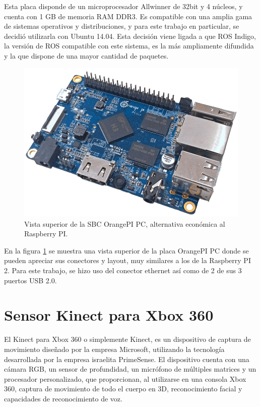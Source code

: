 Esta placa disponde de un microprocesador Allwinner de 32bit y 4 núcleos, y cuenta con 1 GB de memoria RAM DDR3. Es compatible con una amplia gama de sistemas operativos y distribuciones, y para este trabajo en particular, se decidió utilizarla con Ubuntu 14.04. Esta decisión viene ligada a que ROS Indigo, la versión de ROS compatible con este sistema, es la más ampliamente difundida y la que dispone de una mayor cantidad de paquetes.

\begin{figure}[ht]
    \centering
    \includegraphics[scale=.2]{./Figures/orangepi.png}
    \caption{Vista superior de la SBC OrangePI PC, alternativa económica al Raspberry PI.}
    \label{fig:orangePI}
\end{figure}

En la figura \ref{fig:orangePI} se muestra una vista superior de la placa OrangePI PC donde se pueden apreciar sus conectores y layout, muy similares a los de la Raspberry PI 2. Para este trabajo, se hizo uso del conector ethernet así como de 2 de sus 3 puertos USB 2.0.


\section{Sensor Kinect para Xbox 360}

El Kinect para Xbox 360 o simplemente Kinect, es un dispositivo de captura de movimiento diseñado por la empresa Microsoft, utilizando la tecnología desarrollada por la empresa israelita PrimeSense. El dispositivo cuenta con una cámara RGB, un sensor de profundidad, un micrófono de múltiples matrices y un procesador personalizado, que proporcionan, al utilizarse en una consola Xbox 360, captura de movimiento de todo el cuerpo en 3D, reconocimiento facial y capacidades de reconocimiento de voz.

